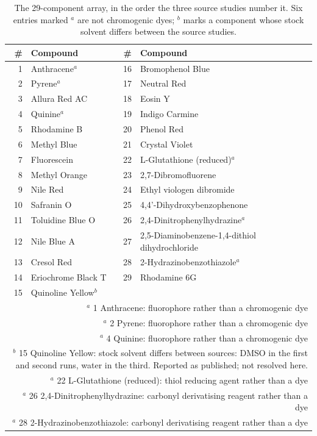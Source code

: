 \begin{table}[htb]
\centering
\caption{The 29-component array, in the order the three source studies number it. Six entries marked $^{a}$ are not chromogenic dyes; $^{b}$ marks a component whose stock solvent differs between the source studies.}
\label{tab:dyepanel}
\small
\begin{tabular}{rlrl}
\hline
\# & Compound & \# & Compound \\
\hline
1 & Anthracene$^{a}$ & 16 & Bromophenol Blue \\
2 & Pyrene$^{a}$ & 17 & Neutral Red \\
3 & Allura Red AC & 18 & Eosin Y \\
4 & Quinine$^{a}$ & 19 & Indigo Carmine \\
5 & Rhodamine B & 20 & Phenol Red \\
6 & Methyl Blue & 21 & Crystal Violet \\
7 & Fluorescein & 22 & L-Glutathione (reduced)$^{a}$ \\
8 & Methyl Orange & 23 & 2,7-Dibromofluorene \\
9 & Nile Red & 24 & Ethyl viologen dibromide \\
10 & Safranin O & 25 & 4,4'-Dihydroxybenzophenone \\
11 & Toluidine Blue O & 26 & 2,4-Dinitrophenylhydrazine$^{a}$ \\
12 & Nile Blue A & 27 & 2,5-Diaminobenzene-1,4-dithiol dihydrochloride \\
13 & Cresol Red & 28 & 2-Hydrazinobenzothiazole$^{a}$ \\
14 & Eriochrome Black T & 29 & Rhodamine 6G \\
15 & Quinoline Yellow$^{b}$ &  &  \\
\hline
\multicolumn{4}{p{13cm}}{\footnotesize $^{a}$ 1 Anthracene: fluorophore rather than a chromogenic dye}\\
\multicolumn{4}{p{13cm}}{\footnotesize $^{a}$ 2 Pyrene: fluorophore rather than a chromogenic dye}\\
\multicolumn{4}{p{13cm}}{\footnotesize $^{a}$ 4 Quinine: fluorophore rather than a chromogenic dye}\\
\multicolumn{4}{p{13cm}}{\footnotesize $^{b}$ 15 Quinoline Yellow: stock solvent differs between sources: DMSO in the first and second runs, water in the third. Reported as published; not resolved here.}\\
\multicolumn{4}{p{13cm}}{\footnotesize $^{a}$ 22 L-Glutathione (reduced): thiol reducing agent rather than a dye}\\
\multicolumn{4}{p{13cm}}{\footnotesize $^{a}$ 26 2,4-Dinitrophenylhydrazine: carbonyl derivatising reagent rather than a dye}\\
\multicolumn{4}{p{13cm}}{\footnotesize $^{a}$ 28 2-Hydrazinobenzothiazole: carbonyl derivatising reagent rather than a dye}\\
\end{tabular}
\end{table}
